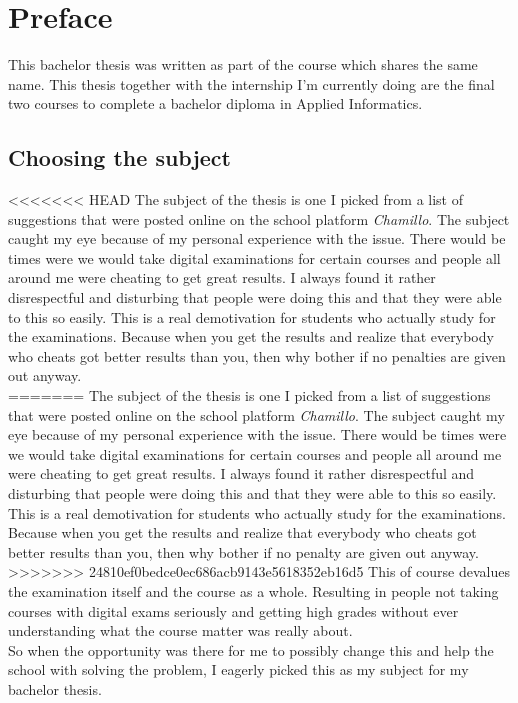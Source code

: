 
\chapter*{Preface}
\label{ch:voorwoord}


This bachelor thesis was written as part of the course which shares the same name. This thesis together with the internship I'm currently doing are the final two courses to complete a bachelor diploma in Applied Informatics.
\section*{Choosing the subject}
<<<<<<< HEAD
The subject of the thesis is one I picked from a list of suggestions that were posted online on the school platform \textit{Chamillo}. The subject caught my eye because of my personal experience with the issue. There would be times were we would take digital examinations for certain courses and people all around me were cheating to get great results. I always found it rather disrespectful and disturbing that people were doing this and that they were able to this so easily. This is a real demotivation for students who actually study for the examinations. Because when you get the results and realize that everybody who cheats got better results than you, then why bother if no penalties are given out anyway.\\
=======
The subject of the thesis is one I picked from a list of suggestions that were posted online on the school platform \textit{Chamillo}. The subject caught my eye because of my personal experience with the issue. There would be times were we would take digital examinations for certain courses and people all around me were cheating to get great results. I always found it rather disrespectful and disturbing that people were doing this and that they were able to this so easily. This is a real demotivation for students who actually study for the examinations. Because when you get the results and realize that everybody who cheats got better results than you, then why bother if no penalty are given out anyway.\\
>>>>>>> 24810ef0bedce0ec686acb9143e5618352eb16d5
This of course devalues the examination itself and the course as a whole. Resulting in people not taking courses with digital exams seriously and getting high grades without ever understanding what the course matter was really about.\\
So when the opportunity was there for me to possibly change this and help the school with solving the problem, I eagerly picked this as my subject for my bachelor thesis.